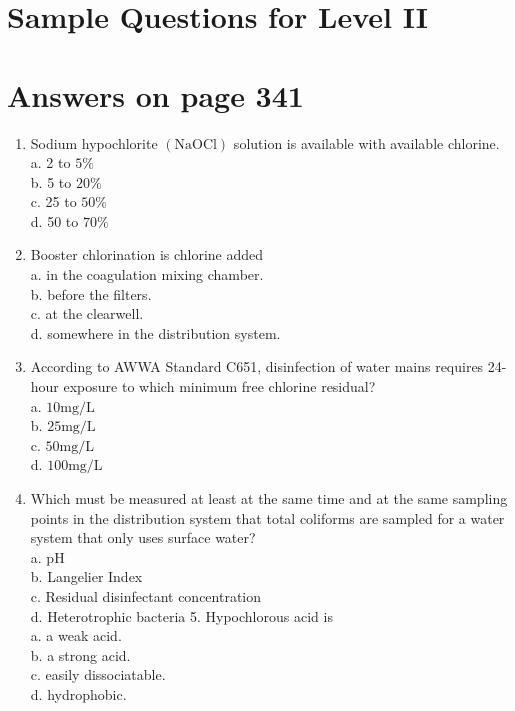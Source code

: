\documentclass[10pt]{article}
\begin{document}
\section{Sample Questions for Level II}
\section{Answers on page 341}
\begin{enumerate}
  \item Sodium hypochlorite $(\mathrm{NaOCl})$ solution is available with available chlorine.\\
a. 2 to $5 \%$\\
b. 5 to $20 \%$\\
c. 25 to $50 \%$\\
d. 50 to $70 \%$

  \item Booster chlorination is chlorine added\\
a. in the coagulation mixing chamber.\\
b. before the filters.\\
c. at the clearwell.\\
d. somewhere in the distribution system.

  \item According to AWWA Standard C651, disinfection of water mains requires 24-hour exposure to which minimum free chlorine residual?\\
a. $10 \mathrm{mg} / \mathrm{L}$\\
b. $25 \mathrm{mg} / \mathrm{L}$\\
c. $50 \mathrm{mg} / \mathrm{L}$\\
d. $100 \mathrm{mg} / \mathrm{L}$

  \item Which must be measured at least at the same time and at the same sampling points in the distribution system that total coliforms are sampled for a water system that only uses surface water?\\
a. $\mathrm{pH}$\\
b. Langelier Index\\
c. Residual disinfectant concentration\\
d. Heterotrophic bacteria 5. Hypochlorous acid is\\
a. a weak acid.\\
b. a strong acid.\\
c. easily dissociatable.\\
d. hydrophobic.

\end{enumerate}
\end{document}
